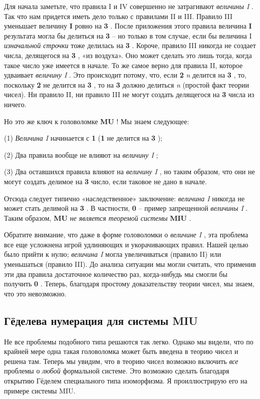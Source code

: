 \documentclass[../main.tex]{subfiles}
\begin{document}
Для начала заметьте, что правила I и IV совершенно не затрагивают \emph{величины I} . Так что нам придется иметь дело только с правилами II и III. Правило III уменьшает величину \textbf{I} ровно на \textbf{3} . После приложения этого правила величина \textbf{I} результата могла бы делиться на \textbf{3} \--- но только в том случае, если бы величина I \emph{изначальной строчки} тоже делилась на \textbf{3} . Короче, правило III никогда не создает числа, делящегося на \textbf{3} , «из воздуха». Оно может сделать это лишь тогда, когда такое число уже имеется в начале. То же самое верно для правила II, которое удваивает \emph{величину I} . Это происходит потому, что, если \textbf{2} \emph{n} делится на \textbf{3} , то, поскольку \textbf{2} не делится на \textbf{3} , то на \textbf{3} должно делиться \emph{n} (простой факт теории чисел). Ни правило II, ни правило III не могут создать делящегося на \textbf{3} числа из ничего.

Но это же ключ к головоломке \textbf{MU} ! Мы знаем следующее:

(1) \emph{Величина I} начинается с \textbf{1} (\textbf{1} не делится на \textbf{3} );

(2) Два правила вообще не влияют на \emph{величину I} ;

(3) Два оставшихся правила влияют на \emph{величину I} , но таким образом, что они не могут создать делимое на \textbf{3} число, если таковое не дано в начале.

Отсюда следует типично «наследственное» заключение: \emph{величина I} никогда не может стать делимой на \textbf{3} . В частности, \textbf{0} \--- пример запрещенной \emph{величины I} . Таким образом, \textbf{MU} \emph{не является теоремой системы} \textbf{MIU} .

Обратите внимание, что даже в форме головоломки о \emph{величине I} , эта проблема все еще усложнена игрой удлиняющих и укорачивающих правил. Нашей целью было прийти к нулю; \emph{величина I} могла увеличиваться (правило II) или уменьшаться (правило III). До анализа ситуации мы могли считать, что применив эти два правила достаточное количество раз, когда-нибудь мы смогли бы получить \textbf{0} . Теперь, благодаря простому доказательству теории чисел, мы знаем, что это невозможно.


\subsection{Гёделева нумерация для системы MIU}

Не все проблемы подобного типа решаются так легко. Однако мы видели, что по крайней мере одна такая головоломка может быть введена в теорию чисел и решена там. Теперь мы увидим, что в теорию чисел возможно включить \emph{все} проблемы о \emph{любой} формальной системе. Это возможно сделать благодаря открытию Гёделем специального типа изоморфизма. Я проиллюстрирую его на примере системы MIU.
\end{document}
